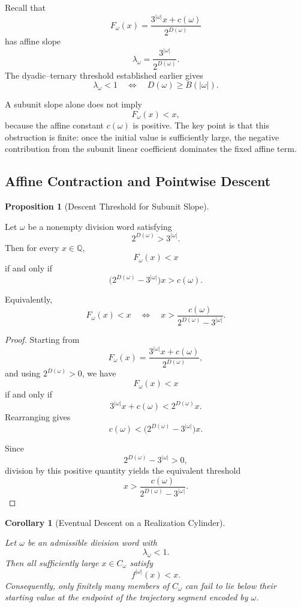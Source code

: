 \documentclass[12pt, oneside]{article}
\numberwithin{equation}{section}
\theoremstyle{definition}
\newtheorem{proposition}{Proposition}[section]
\theoremstyle{plain}
\newtheorem{corollary}[theorem]{Corollary}
\theoremstyle{remark}
\begin{document}
Recall that
\[
F_\omega(x)
=
\frac{3^{|\omega|}x+c(\omega)}
     {2^{D(\omega)}}
\]
has affine slope
\[
\lambda_\omega
=
\frac{3^{|\omega|}}{2^{D(\omega)}}.
\]
The dyadic--ternary threshold established earlier gives
\[
\lambda_\omega<1
\quad\Longleftrightarrow\quad
D(\omega)\ge B(|\omega|).
\]

A subunit slope alone does not imply
\[
F_\omega(x)<x,
\]
because the affine constant \(c(\omega)\) is positive. The key point is
that this obstruction is finite: once the initial value is sufficiently
large, the negative contribution from the subunit linear coefficient
dominates the fixed affine term.

\subsection{Affine Contraction and Pointwise Descent}

\begin{proposition}[Descent Threshold for Subunit Slope]
\label{prop:affine-descent-threshold}

Let \(\omega\) be a nonempty division word satisfying
\[
2^{D(\omega)}>3^{|\omega|}.
\]
Then for every \(x\in\mathbb Q\),
\[
F_\omega(x)<x
\]
if and only if
\[
\bigl(2^{D(\omega)}-3^{|\omega|}\bigr)x
>
c(\omega).
\]

Equivalently,
\[
F_\omega(x)<x
\quad\Longleftrightarrow\quad
x>
\frac{c(\omega)}
     {2^{D(\omega)}-3^{|\omega|}}.
\]
\end{proposition}

\begin{proof}
Starting from
\[
F_\omega(x)
=
\frac{3^{|\omega|}x+c(\omega)}
     {2^{D(\omega)}},
\]
and using \(2^{D(\omega)}>0\), we have
\[
F_\omega(x)<x
\]
if and only if
\[
3^{|\omega|}x+c(\omega)
<
2^{D(\omega)}x.
\]
Rearranging gives
\[
c(\omega)
<
\bigl(2^{D(\omega)}-3^{|\omega|}\bigr)x.
\]

Since
\[
2^{D(\omega)}-3^{|\omega|}>0,
\]
division by this positive quantity yields the equivalent threshold
\[
x>
\frac{c(\omega)}
     {2^{D(\omega)}-3^{|\omega|}}.
\]
\end{proof}

\begin{corollary}[Eventual Descent on a Realization Cylinder]
\label{cor:eventual-descent-on-cylinder}

Let \(\omega\) be an admissible division word with
\[
\lambda_\omega<1.
\]
Then all sufficiently large \(x\in C_\omega\) satisfy
\[
f^{|\omega|}(x)<x.
\]
Consequently, only finitely many members of \(C_\omega\) can fail to
lie below their starting value at the endpoint of the trajectory segment
encoded by \(\omega\).
\end{corollary}
\end{document}
